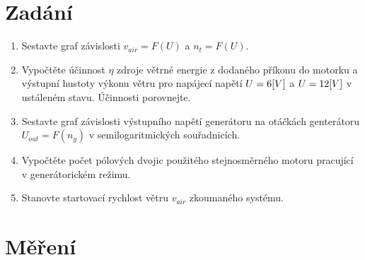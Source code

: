 \documentclass{article}
\begin{document}


\begin{minipage}[t]{\textwidth}
  \section*{Zadání}
  \begin{enumerate}
    \item Sestavte graf závislosti \(v_{air} = F(U)\) a \(n_t = F(U)\).
    \item Vypočtěte účinnost \(\eta\) zdroje větrné energie z dodaného příkonu do motorku a výstupní hustoty výkonu větru pro napájecí napětí \(U=6\-[V]\) a \(U=12\-[V]\) v ustáleném stavu. Účinnosti porovnejte.
    \item Sestavte graf závislosti výstupního napětí generátoru na otáčkách genterátoru \(U_{out}=F(n_g)\) v semilogaritmických souřadnicích.
    \item Vypočtěte počet pólových dvojic použitého stejnosměrného motoru pracující v generátorickém režimu.
    \item Stanovte startovací rychlost větru \(v_{air}\) zkoumaného systému.
  \end{enumerate}
\end{minipage}


\section{Měření}
\end{document}
